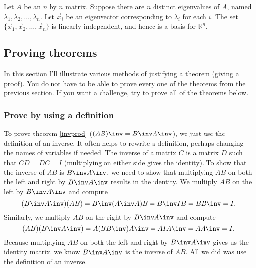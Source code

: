 \begin{theorem}\label{thm independent eigenvectors}
Let $A$ be an $n$ by $n$ matrix.  Suppose there are $n$ distinct eigenvalues of $A$, named $\lambda_1, \lambda_2, \ldots, \lambda_n$. Let $\vec x_i$ be an eigenvector corresponding to $\lambda_i$ for each $i$.  The set $\{\vec x_1,\vec x_2, \ldots,\vec x_n\}$ is linearly independent, and hence is a basis for $\mathbb{R}^n$.
\end{theorem}











\subsection{Proving theorems}

In this section I'll illustrate various methods of justifying a theorem (giving a proof). You do not have to be able to prove every one of the theorems from the previous section. If you want a challenge, try to prove all of the theorems below.

\subsubsection{Prove by using a definition}
To prove theorem \ref{invprod} ($(AB)\inv=B\inv A \inv$), we just use the definition of an inverse. It often helps to rewrite a definition, perhaps changing the names of variables if needed. The inverse of a matrix $C$ is a matrix $D$ such that $CD=DC=I$ (multiplying on either side gives the identity). To show that the inverse of $AB$ is $B\inv A\inv$, we need to show that multiplying $AB$ on both the left and right by $B\inv A\inv$ results in the identity. We multiply $AB$ on the left by $B\inv A\inv$ and compute 
$$(B\inv A\inv)(AB) = B\inv (A\inv A)B = B\inv IB = BB\inv=I.$$
Similarly, we multiply $AB$ on the right by $B\inv A\inv$ and compute 
$$(AB)(B\inv A\inv) = A(BB\inv) A\inv = AIA\inv = AA\inv=I.$$
 Because multiplying $AB$ on both the left and right by $B\inv A\inv$ gives us the identity matrix, we know $B\inv A\inv$ is the inverse of $AB$. All we did was use the definition of an inverse.

